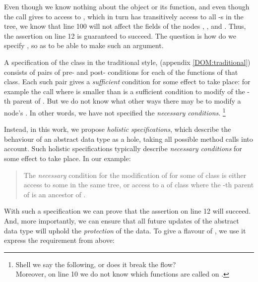 Even though we know nothing about the  object or its  function, and even though the call gives to   access to , which in turn has transitively access to all  -s in the tree, 
we know that %
line 100 will not affect the    fields of the nodes , , and . 
Thus, the assertion on line 12 is guaranteed to succeed. 
The question is how do we specify , so as to be able to make such an argument. %

A  specification of the class  
in the traditional   style, \eg  \cite{Leavens-etal07} (\cf appendix \ref{DOM:traditional}) consists of pairs of pre- and post- conditions for each of the functions of that class. Each such pair gives a {\em sufficient} condition for some effect to take place: for example the call  where  is smaller than  is a sufficient condition to  modify    of the -th parent of . But we do not know what other ways there may be  to modify a node's  . In other words, we have not specified the \emph{necessary conditions}. \footnote{Shell we say the following, or does it break the flow? \\
Moreover, on line 10 we do not know which functions are called on .}

Instead, in this work, we propose \emph{holistic specifications}, which describe the behaviour of an abstract data type as a hole, taking all possible method calls into account. Such holistic specifications typically describe \emph{necessary conditions} for some effect to take place. In our example:

\begin{quote}
The \emph{necessary} condition for the modification of  for some  of class   is either access to some    in the same tree, or  access to a  of class  where the -th parent of  is an ancestor of .
\end{quote}


With such a specification we can prove that the assertion on line 12 will succeed. And, more importantly, we can ensure that all future updates of the  abstract data type will uphold the \emph{protection} of the  data.
%
%
To give a flavour of \Chainmail, we use it  express the requirement from above:
\vspace{.1cm}


